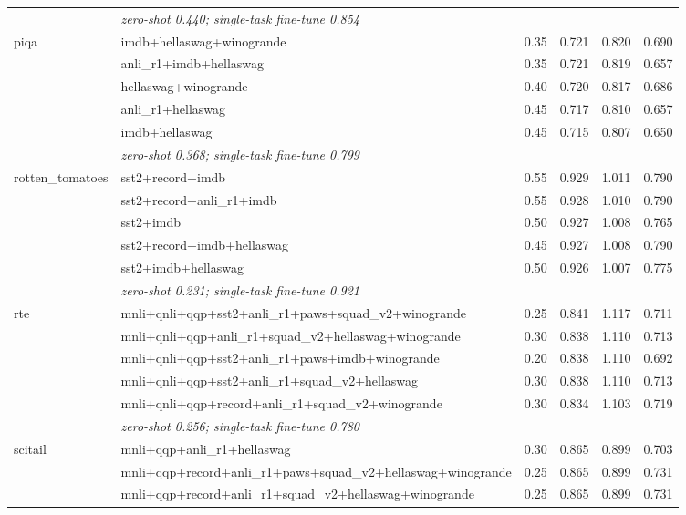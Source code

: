 \begin{table}[t]
\begin{tabular}{llrrrr}
    & \multicolumn{5}{l}{\textit{zero-shot 0.440; single-task fine-tune 0.854}} \\
    \addlinespace
    piqa & imdb+hellaswag+winogrande & 0.35 & 0.721 & 0.820 & 0.690 \\
     & anli\_r1+imdb+hellaswag & 0.35 & 0.721 & 0.819 & 0.657 \\
     & hellaswag+winogrande & 0.40 & 0.720 & 0.817 & 0.686 \\
     & anli\_r1+hellaswag & 0.45 & 0.717 & 0.810 & 0.657 \\
     & imdb+hellaswag & 0.45 & 0.715 & 0.807 & 0.650 \\
    & \multicolumn{5}{l}{\textit{zero-shot 0.368; single-task fine-tune 0.799}} \\
    \addlinespace
    rotten\_tomatoes & sst2+record+imdb & 0.55 & 0.929 & 1.011 & 0.790 \\
     & sst2+record+anli\_r1+imdb & 0.55 & 0.928 & 1.010 & 0.790 \\
     & sst2+imdb & 0.50 & 0.927 & 1.008 & 0.765 \\
     & sst2+record+imdb+hellaswag & 0.45 & 0.927 & 1.008 & 0.790 \\
     & sst2+imdb+hellaswag & 0.50 & 0.926 & 1.007 & 0.775 \\
    & \multicolumn{5}{l}{\textit{zero-shot 0.231; single-task fine-tune 0.921}} \\
    \addlinespace
    rte & mnli+qnli+qqp+sst2+anli\_r1+paws+squad\_v2+winogrande & 0.25 & 0.841 & 1.117 & 0.711 \\
     & mnli+qnli+qqp+anli\_r1+squad\_v2+hellaswag+winogrande & 0.30 & 0.838 & 1.110 & 0.713 \\
     & mnli+qnli+qqp+sst2+anli\_r1+paws+imdb+winogrande & 0.20 & 0.838 & 1.110 & 0.692 \\
     & mnli+qnli+qqp+sst2+anli\_r1+squad\_v2+hellaswag & 0.30 & 0.838 & 1.110 & 0.713 \\
     & mnli+qnli+qqp+record+anli\_r1+squad\_v2+winogrande & 0.30 & 0.834 & 1.103 & 0.719 \\
    & \multicolumn{5}{l}{\textit{zero-shot 0.256; single-task fine-tune 0.780}} \\
    \addlinespace
    scitail & mnli+qqp+anli\_r1+hellaswag & 0.30 & 0.865 & 0.899 & 0.703 \\
     & mnli+qqp+record+anli\_r1+paws+squad\_v2+hellaswag+winogrande & 0.25 & 0.865 & 0.899 & 0.731 \\
     & mnli+qqp+record+anli\_r1+squad\_v2+hellaswag+winogrande & 0.25 & 0.865 & 0.899 & 0.731 \\

\end{tabular}
\end{table}
